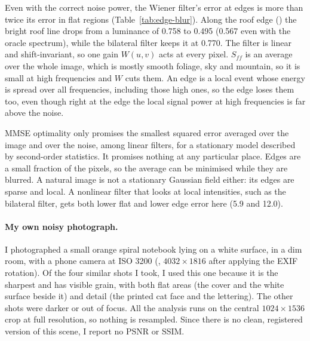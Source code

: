 Even with the correct noise power, the Wiener filter's error at edges is more
than twice its error in flat regions (Table~\ref{tab:edge-blur}). Along the roof
edge () the bright roof line drops from a luminance of
0.758 to 0.495 (0.567 even with the oracle spectrum), while the bilateral filter
keeps it at 0.770. The filter is linear and shift-invariant, so one gain
$W(u,v)$ acts at every pixel. $S_{ff}$ is an average over the whole image, which
is mostly smooth foliage, sky and mountain, so it is small at high frequencies
and $W$ cuts them. An edge is a local event whose energy is spread over all
frequencies, including those high ones, so the edge loses them too, even though
right at the edge the local signal power at high frequencies is far above the
noise.

MMSE optimality only promises the smallest squared error averaged over the image
and over the noise, among linear filters, for a stationary model described by
second-order statistics. It promises nothing at any particular place. Edges are a
small fraction of the pixels, so the average can be minimised while they are
blurred. A natural image is not a stationary Gaussian field either: its edges are
sparse and local. A nonlinear filter that looks at local intensities, such as the
bilateral filter, gets both lower flat and lower edge error here (5.9 and 12.0).

\paragraph{My own noisy photograph.} I photographed a small orange spiral
notebook lying on a white surface, in a dim room, with a phone camera at ISO 3200
(, $4032\times1816$ after applying the EXIF rotation). Of
the four similar shots I took, I used this one because it is the sharpest and has
visible grain, with both flat areas (the cover and the white surface beside it)
and detail (the printed cat face and the lettering). The other shots were darker
or out of focus. All the analysis runs on
the central $1024\times1536$ crop at full resolution, so nothing is resampled.
Since there is no clean, registered version of this scene, I report no PSNR or
SSIM.

